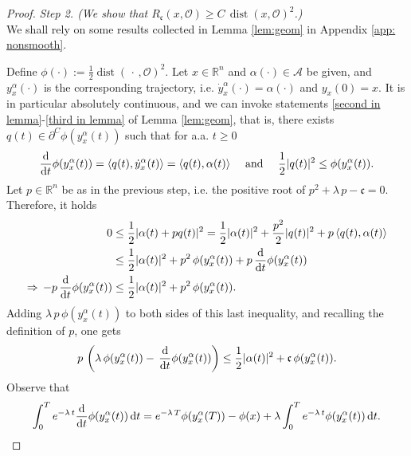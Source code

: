 \documentclass[12pt]{amsart}
\newcommand{\D}[1]{\mbox{\rm #1}}
\newcommand{\dd}{\D{d}}
\numberwithin{equation}{section}
\theoremstyle{plain}
\begin{document}
\begin{proof}
\textit{Step 2. (We show that $R_{\mathfrak{c}}(x,\mathscr{O}) \geq C\,\operatorname{dist}(x,\mathscr{O})^{2}$.) } \\
We shall rely on some results collected in Lemma \ref{lem:geom} in Appendix \ref{app: nonsmooth}. 

Define $\phi(\cdot):=\frac{1}{2}\operatorname{dist}(\,\cdot\,,\mathscr{O})^{2}$. Let $x\in \mathbb{R}^{n}$ and $\alpha(\cdot)\in \mathcal{A}$ be given, and $y_{x}^{\alpha}(\cdot)$ is the corresponding trajectory, i.e. $\dot{y}_{x}^{\alpha}(\cdot) = \alpha(\cdot)$ and $y_{x}(0)=x$. It is in particular absolutely continuous, and we can invoke statements \ref{second in lemma}-\ref{third in lemma} of Lemma \ref{lem:geom}, that is, there exists $q(t)\in \partial^{C}\phi(y_{x}^{\alpha}(t))$ such that for a.a. $t\geq0$
\begin{equation}\label{useful in proof of ricc}
    \frac{\dd}{\dd t}\phi(y_{x}^{\alpha}(t)) = \langle q(t),\dot{y}_{x}^{\alpha}(t) \rangle = \langle q(t), \alpha(t) \rangle \quad \text{ and } \quad \frac{1}{2}|q(t)|^{2}\leq \phi(y_{x}^{\alpha}(t)).
\end{equation}
Let $p\in \mathbb{R}^{n}$ be as in the previous step, i.e. the positive root of $p^{2} + \lambda\,p - \mathfrak{c}=0$. 
Therefore, it holds
\begin{equation*}
\begin{aligned}
    0 & \leq \frac{1}{2}|\alpha(t) + pq(t)|^{2} = \frac{1}{2}|\alpha(t)|^{2} + \frac{p^{2}}{2}|q(t)|^{2} + p\,\langle q(t), \alpha(t)\rangle \\
    & \leq \frac{1}{2}|\alpha(t)|^{2} + p^{2}\,\phi(y_{x}^{\alpha}(t)) + p\,\frac{\dd}{\dd t}\phi(y_{x}^{\alpha}(t))\\
    \Rightarrow\, -p\,\frac{\dd}{\dd t}\phi(y_{x}^{\alpha}(t)) & \leq \frac{1}{2}|\alpha(t)|^{2} + p^{2}\,\phi(y_{x}^{\alpha}(t)).
\end{aligned}
\end{equation*}
Adding $\lambda\,p\,\phi(y_{x}^{\alpha}(t))$ to both sides of this last inequality, and recalling the definition of $p$, one gets 
\begin{equation}\label{ineq in step 2 of proof Ricc}
    p\,\left(\lambda\,\phi(y_{x}^{\alpha}(t)) -\,\frac{\dd}{\dd t}\phi(y_{x}^{\alpha}(t)) \right) \leq \frac{1}{2}|\alpha(t)|^{2} + \mathfrak{c}\,\phi(y_{x}^{\alpha}(t)).
\end{equation}
Observe that 
\begin{equation*}
    \int_{0}^{T} e^{-\lambda \, t} \frac{\dd}{\dd t}\phi(y_{x}^{\alpha}(t))\,\dd t = e^{-\lambda\,T}\phi(y_{x}^{\alpha}(T)) - \phi(x) + \lambda \int_{0}^{T} e^{-\lambda \, t}\phi(y_{x}^{\alpha}(t))\,\dd t.

\end{equation*}
\end{proof}
\end{document}
